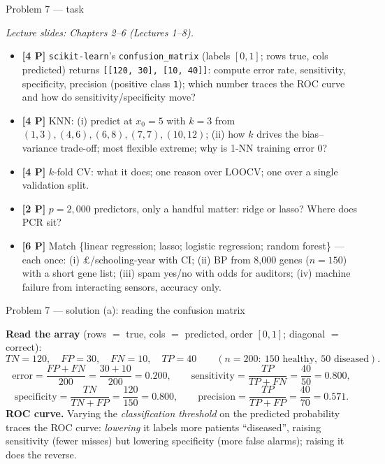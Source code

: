 \documentclass[aspectratio=169,11pt]{beamer}
\begin{document}
\begin{frame}{Problem 7 --- task}
  \begin{exercise}
    {\scriptsize\itshape Lecture slides: Chapters 2--6 (Lectures 1--8).}\par\smallskip
    \begin{itemize}
      \item[(a)] \textbf{[4 P]} \texttt{scikit-learn}'s \texttt{confusion\_matrix} (labels
        $[0,1]$; rows true, cols predicted) returns \texttt{[[120, 30], [10, 40]]}: compute
        error rate, sensitivity, specificity, precision (positive class \texttt{1}); which
        number traces the ROC curve and how do sensitivity/specificity move?
      \item[(b)] \textbf{[4 P]} KNN: (i) predict at $x_0=5$ with $k=3$ from
        $(1{,}3),(4{,}6),(6{,}8),(7{,}7),(10{,}12)$; (ii) how $k$ drives the bias--variance
        trade-off; most flexible extreme; why is 1-NN training error $0$?
      \item[(c)] \textbf{[4 P]} $k$-fold CV: what it does; one reason over LOOCV; one over a
        single validation split.
      \item[(d)] \textbf{[2 P]} $p=2{,}000$ predictors, only a handful matter: ridge or lasso?
        Where does PCR sit?
      \item[(e)] \textbf{[6 P]} Match \{linear regression; lasso; logistic regression; random
        forest\} --- each once: (i) $\pounds$/schooling-year with CI; (ii) BP from 8{,}000 genes
        ($n{=}150$) with a short gene list; (iii) spam yes/no with odds for auditors;
        (iv) machine failure from interacting sensors, accuracy only.
    \end{itemize}
  \end{exercise}
\end{frame}

\begin{frame}{Problem 7 --- solution (a): reading the confusion matrix}
  \begin{solutionbox}
    \textbf{Read the array} (rows $=$ true, cols $=$ predicted, order $[0,1]$; diagonal $=$ correct):
    \[
      TN=120,\quad FP=30,\quad FN=10,\quad TP=40\qquad(n=200:\ 150\text{ healthy},\ 50\text{ diseased}).
    \]
    \[
      \text{error}=\frac{FP+FN}{200}=\frac{30+10}{200}=\mathbf{0.200},\qquad
      \text{sensitivity}=\frac{TP}{TP+FN}=\frac{40}{50}=\mathbf{0.800},
    \]
    \[
      \text{specificity}=\frac{TN}{TN+FP}=\frac{120}{150}=\mathbf{0.800},\qquad
      \text{precision}=\frac{TP}{TP+FP}=\frac{40}{70}=\mathbf{0.571}.
    \]
    \textbf{ROC curve.} Varying the \emph{classification threshold} on the predicted probability
    traces the ROC curve: \emph{lowering} it labels more patients ``diseased'', raising sensitivity
    (fewer misses) but lowering specificity (more false alarms); raising it does the reverse.
  \end{solutionbox}
\end{frame}
\end{document}
